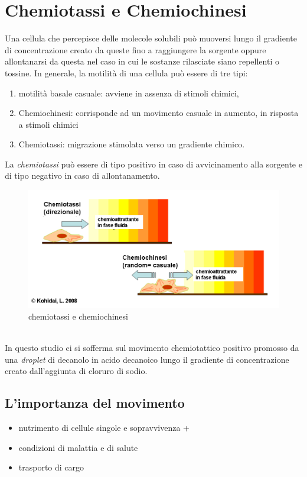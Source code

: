 \section{Chemiotassi e Chemiochinesi}
\label{sec:456}
Una cellula che percepisce delle molecole solubili può muoversi lungo il gradiente di concentrazione creato da queste fino a raggiungere la sorgente oppure allontanarsi da questa nel caso in cui le sostanze rilasciate siano repellenti o tossine. 
In generale, la motilità di una cellula può essere di tre tipi:
\begin{enumerate}
\item motilità basale casuale: avviene in assenza di stimoli chimici,
\item Chemiochinesi: corrisponde ad un movimento casuale in aumento, in risposta a stimoli chimici
\item Chemiotassi: migrazione stimolata verso un gradiente chimico.
\end{enumerate}
La \emph{chemiotassi} può essere di tipo positivo in caso di avvicinamento alla sorgente e di tipo negativo in caso di allontanamento.
	\begin{figure}[h]
	  \includegraphics[scale=0.60]{immagini/chemochin.png}
		\centering	
	 \caption{chemiotassi e chemiochinesi}
	\end{figure}
\\In questo studio ci si sofferma sul movimento chemiotattico positivo promosso da una \emph{droplet} di decanolo in acido decanoico lungo il gradiente di concentrazione creato dall'aggiunta di cloruro di sodio.
\subsection{L'importanza del movimento}
\label{sec:00456}

\begin {itemize}
	\item nutrimento di cellule singole e sopravvivenza + 
	\item condizioni di malattia e di salute
	\item trasporto di cargo
\end{itemize}

